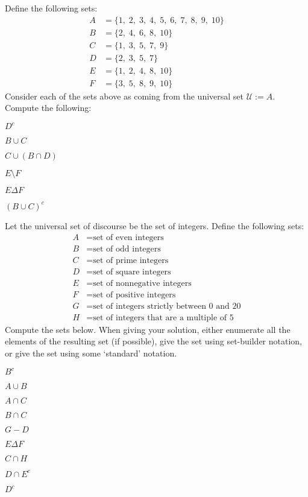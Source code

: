 \documentclass[11pt,letterpaper]{article}
\begin{document}
 Define the following sets:
	\[
	\begin{aligned}
	A&= \{ 1, \; 2, \; 3, \; 4, \; 5, \; 6, \; 7, \; 8, \; 9, \; 10 \} \\
	B&= \{ 2, \; 4, \; 6, \; 8, \; 10 \} \\
	C&= \{ 1, \; 3, \; 5, \; 7, \; 9 \} \\
	D&= \{ 2, \; 3, \; 5, \; 7 \} \\
	E&= \{ 1, \; 2, \; 4, \; 8, \; 10 \} \\
	F&= \{ 3, \; 5, \; 8, \; 9, \; 10 \}
	\end{aligned}
	\]
Consider each of the sets above as coming from the universal set $\mathcal{U}:= A$. Compute the following:
	\begin{2enumerate}
	\item $D^c$
	\item $B \cup C$
	\item $C \cup (B \cap D)$
	\item $E \setminus F$
	\item $E \Delta F$
	\item $(B \cup C)^c$
	\end{2enumerate}



\newpage



 Let the universal set of discourse be the set of integers. Define the following sets:
	\[
	\begin{aligned}
	A&= \text{set of even integers} \\
	B&= \text{set of odd integers} \\
	C&= \text{set of prime integers} \\
	D&= \text{set of square integers} \\
	E&= \text{set of nonnegative integers} \\
	F&= \text{set of positive integers} \\
	G&= \text{set of integers strictly between 0 and 20} \\
	H&= \text{set of integers that are a multiple of 5}
	\end{aligned}
	\]
Compute the sets below. When giving your solution, either enumerate all the elements of the resulting set (if possible), give the set using set-builder notation, or give the set using some `standard' notation. 
	\begin{2enumerate}
	\item $B^c$
	\item $A \cup B$
	\item $A \cap C$
	\item $B \cap C$
	\item $G - D$	
	\item $E \Delta F$
	\item $C \cap H$
	\item $D \cap E^c$
	\item $D^c$
	\end{2enumerate}
	
\end{document}
